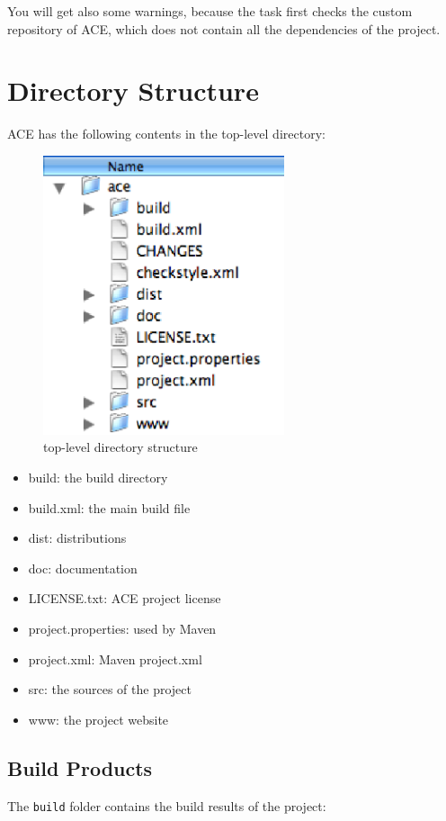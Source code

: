 \documentclass[11pt,a4paper]{article}
\begin{document}
You will get also some warnings, because the task first checks the custom
repository of ACE, which does not contain all the dependencies of the project.


\section{Directory Structure}

ACE has the following contents in the top-level directory:

\begin{figure}[H]
 \centering
 \includegraphics[width=7.1cm,height=8.2cm]{../images/developersguide/dir-toplevel.eps}
 \caption{top-level directory structure}
\end{figure}

\begin{itemize}
 \item build: the build directory
 \item build.xml: the main build file
 \item dist: distributions
 \item doc: documentation
 \item LICENSE.txt: ACE project license
 \item project.properties: used by Maven
 \item project.xml: Maven project.xml
 \item src: the sources of the project
 \item www: the project website
\end{itemize}

\subsection{Build Products}
The \texttt{build} folder contains the build results of the project:
\end{document}
